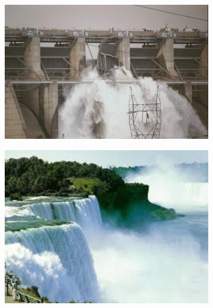 \documentclass{beamer}
\begin{document}
\begin{frame}
\begin{figure}
 		 	\vspace{1em}
 		 	
 			\begin{subfigure}[c]{0.3\textwidth}
 		 	      \includegraphics[width=1\textwidth]{pic/images2.jpg}
 		 	\end{subfigure}
 		 	 \begin{subfigure}[c]{0.3\textwidth}
 		 	      \includegraphics[width=1\textwidth]{pic/images3.jpg}
 		 	\end{subfigure}   
 		\end{figure}
\end{frame}	
\end{document}
